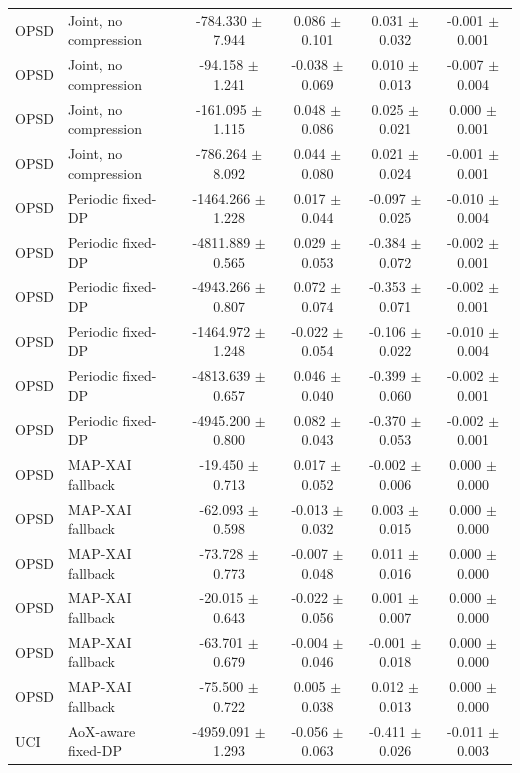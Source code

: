\begin{table}[t]
\begin{tabular}{llcccc}
OPSD & Joint, no compression & -784.330 $\pm$ 7.944 & 0.086 $\pm$ 0.101 & 0.031 $\pm$ 0.032 & -0.001 $\pm$ 0.001 \\
OPSD & Joint, no compression & -94.158 $\pm$ 1.241 & -0.038 $\pm$ 0.069 & 0.010 $\pm$ 0.013 & -0.007 $\pm$ 0.004 \\
OPSD & Joint, no compression & -161.095 $\pm$ 1.115 & 0.048 $\pm$ 0.086 & 0.025 $\pm$ 0.021 & 0.000 $\pm$ 0.001 \\
OPSD & Joint, no compression & -786.264 $\pm$ 8.092 & 0.044 $\pm$ 0.080 & 0.021 $\pm$ 0.024 & -0.001 $\pm$ 0.001 \\
OPSD & Periodic fixed-DP & -1464.266 $\pm$ 1.228 & 0.017 $\pm$ 0.044 & -0.097 $\pm$ 0.025 & -0.010 $\pm$ 0.004 \\
OPSD & Periodic fixed-DP & -4811.889 $\pm$ 0.565 & 0.029 $\pm$ 0.053 & -0.384 $\pm$ 0.072 & -0.002 $\pm$ 0.001 \\
OPSD & Periodic fixed-DP & -4943.266 $\pm$ 0.807 & 0.072 $\pm$ 0.074 & -0.353 $\pm$ 0.071 & -0.002 $\pm$ 0.001 \\
OPSD & Periodic fixed-DP & -1464.972 $\pm$ 1.248 & -0.022 $\pm$ 0.054 & -0.106 $\pm$ 0.022 & -0.010 $\pm$ 0.004 \\
OPSD & Periodic fixed-DP & -4813.639 $\pm$ 0.657 & 0.046 $\pm$ 0.040 & -0.399 $\pm$ 0.060 & -0.002 $\pm$ 0.001 \\
OPSD & Periodic fixed-DP & -4945.200 $\pm$ 0.800 & 0.082 $\pm$ 0.043 & -0.370 $\pm$ 0.053 & -0.002 $\pm$ 0.001 \\
OPSD & MAP-XAI fallback & -19.450 $\pm$ 0.713 & 0.017 $\pm$ 0.052 & -0.002 $\pm$ 0.006 & 0.000 $\pm$ 0.000 \\
OPSD & MAP-XAI fallback & -62.093 $\pm$ 0.598 & -0.013 $\pm$ 0.032 & 0.003 $\pm$ 0.015 & 0.000 $\pm$ 0.000 \\
OPSD & MAP-XAI fallback & -73.728 $\pm$ 0.773 & -0.007 $\pm$ 0.048 & 0.011 $\pm$ 0.016 & 0.000 $\pm$ 0.000 \\
OPSD & MAP-XAI fallback & -20.015 $\pm$ 0.643 & -0.022 $\pm$ 0.056 & 0.001 $\pm$ 0.007 & 0.000 $\pm$ 0.000 \\
OPSD & MAP-XAI fallback & -63.701 $\pm$ 0.679 & -0.004 $\pm$ 0.046 & -0.001 $\pm$ 0.018 & 0.000 $\pm$ 0.000 \\
OPSD & MAP-XAI fallback & -75.500 $\pm$ 0.722 & 0.005 $\pm$ 0.038 & 0.012 $\pm$ 0.013 & 0.000 $\pm$ 0.000 \\
UCI & AoX-aware fixed-DP & -4959.091 $\pm$ 1.293 & -0.056 $\pm$ 0.063 & -0.411 $\pm$ 0.026 & -0.011 $\pm$ 0.003 \\

\end{tabular}
\end{table}
